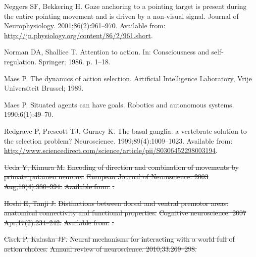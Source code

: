 \documentclass[10pt,letterpaper]{article}
\providecommand{\DIFdeltex}[1]{{\protect\color{red}\sout{#1}}}                      %
\providecommand{\DIFdelbegin}{} %
\providecommand{\DIFdel}[1]{\texorpdfstring{\DIFdeltex{#1}}{}} %
\begin{document}
\begin{thebibliography}{10}
Neggers SF, Bekkering H.
\newblock Gaze anchoring to a pointing target is present during the entire
  pointing movement and is driven by a non-visual signal.
\newblock Journal of Neurophysiology. 2001;86(2):961--970.
\newblock Available from:
  \url{http://jn.physiology.org/content/86/2/961.short}.

Norman DA, Shallice T.
\newblock Attention to action.
\newblock In: Consciousness and self-regulation. Springer; 1986. p. 1--18.

Maes P.
\newblock The dynamics of action selection.
\newblock Artificial Intelligence Laboratory, Vrije Universiteit Brussel; 1989.

Maes P.
\newblock Situated agents can have goals.
\newblock Robotics and autonomous systems. 1990;6(1):49--70.

Redgrave P, Prescott TJ, Gurney K.
\newblock The basal ganglia: a vertebrate solution to the selection problem?
\newblock Neuroscience. 1999;89(4):1009--1023.
\newblock Available from:
  \url{http://www.sciencedirect.com/science/article/pii/S0306452298003194}.

\DIFdelbegin %
\DIFdel{Ueda Y, Kimura M.
}%
\DIFdel{Encoding of direction and combination of movements by primate putamen
  neurons.
}%
\DIFdel{European Journal of Neuroscience. 2003 Aug;18(4):980--994.
}%
\DIFdel{Available from:
  }%
\DIFdel{.
}%

\DIFdel{Hoshi E, Tanji J.
}%
\DIFdel{Distinctions between dorsal and ventral premotor areas: anatomical
  connectivity and functional properties.
}%
\DIFdel{Cognitive neuroscience. 2007 Apr;17(2):234--242.
}%
\DIFdel{Available from:
  }%
\DIFdel{.
}%

\DIFdel{Cisek P, Kalaska JF.
}%
\DIFdel{Neural mechanisms for interacting with a world full of action
  choices.
}%
\DIFdel{Annual review of neuroscience. 2010;33:269--298.
}%


\end{thebibliography}
\end{document}
